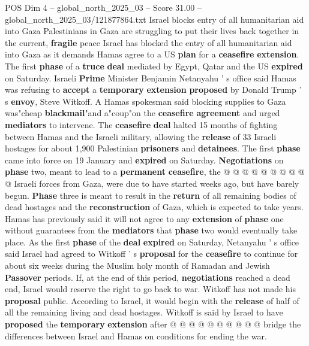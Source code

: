 \begin{textsample}{POS Dim 4 – global\_north\_2025\_03 – Score 31.00 – global\_north\_2025\_03/121877864.txt}  \label{ex:f4_pos_066}
Israel blocks entry of all humanitarian aid into Gaza Palestinians in Gaza are struggling to put their lives back together in the current, \textbf{fragile} peace Israel has blocked the entry of all humanitarian aid into Gaza as it demands Hamas agree to a US \textbf{plan} for a \textbf{ceasefire} \textbf{extension}.
The first \textbf{phase} of a \textbf{truce} \textbf{deal} mediated by Egypt, Qatar and the US \textbf{expired} on Saturday.
Israeli \textbf{Prime} Minister Benjamin Netanyahu ' s office said Hamas was refusing to \textbf{accept} a \textbf{temporary} \textbf{extension} \textbf{proposed} by Donald Trump ' s \textbf{envoy}, Steve Witkoff.
A Hamas spokesman said blocking supplies to Gaza was"cheap \textbf{blackmail}"and a"coup"on the \textbf{ceasefire} \textbf{agreement} and urged \textbf{mediators} to intervene.
The \textbf{ceasefire} \textbf{deal} halted 15 months of fighting between Hamas and the Israeli military, allowing the \textbf{release} of 33 Israeli hostages for about 1,900 Palestinian \textbf{prisoners} and \textbf{detainees}.
The first \textbf{phase} came into force on 19 January and \textbf{expired} on Saturday. \textbf{Negotiations} on \textbf{phase} two, meant to lead to a \textbf{permanent} \textbf{ceasefire}, the @ @ @ @ @ @ @ @ @ @ Israeli forces from Gaza, were due to have started weeks ago, but have barely begun. \textbf{Phase} three is meant to result in the \textbf{return} of all remaining bodies of dead hostages and the \textbf{reconstruction} of Gaza, which is expected to take years.
Hamas has previously said it will not agree to any \textbf{extension} of \textbf{phase} one without guarantees from the \textbf{mediators} that \textbf{phase} two would eventually take place.
As the first \textbf{phase} of the \textbf{deal} \textbf{expired} on Saturday, Netanyahu ' s office said Israel had agreed to Witkoff ' s \textbf{proposal} for the \textbf{ceasefire} to continue for about six weeks during the Muslim holy month of Ramadan and Jewish \textbf{Passover} periods.
If, at the end of this period, \textbf{negotiations} reached a dead end, Israel would reserve the right to go back to war.
Witkoff has not made his \textbf{proposal} public.
According to Israel, it would begin with the \textbf{release} of half of all the remaining living and dead hostages.
Witkoff is said by Israel to have \textbf{proposed} the \textbf{temporary} \textbf{extension} after @ @ @ @ @ @ @ @ @ @ bridge the differences between Israel and Hamas on conditions for ending the war.

\end{textsample}
